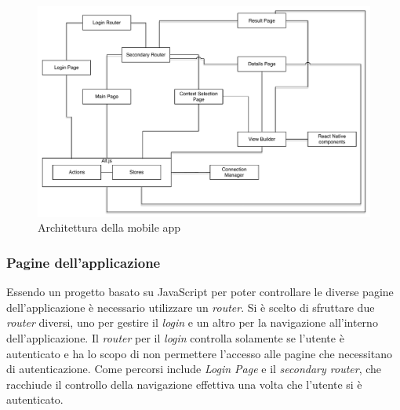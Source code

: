 \begin{figure}[h]
	\centering
	\includegraphics[width=\textwidth]{4-progettazione-alto-livello/Immagini/app_architecture.pdf}
	\caption{Architettura della mobile app}\label{fig:app-architecture}
\end{figure}

\subsubsection{Pagine dell'applicazione}

Essendo un progetto basato su JavaScript per poter controllare le diverse pagine dell'applicazione è necessario utilizzare un \emph{router}. Si è scelto di sfruttare due \emph{router} diversi, uno per gestire il \emph{login} e un altro per la navigazione all'interno dell'applicazione. Il \emph{router} per il \emph{login} controlla solamente se l'utente è autenticato e ha lo scopo di non permettere l'accesso alle pagine che necessitano di autenticazione. Come percorsi include \emph{Login Page} e il \emph{secondary router}, che racchiude il controllo della navigazione effettiva una volta che l'utente si è autenticato.


